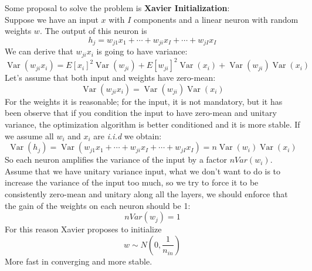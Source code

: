 Some proposal to solve the problem is \textbf{Xavier Initialization}: \\
Suppose we have an input $x$ with $I$ components and a linear neuron with random weights $w$. The output of this neuron is
$$
h_{j}=w_{j 1} x_{1}+\cdots+w_{j i} x_{I}+\cdots+w_{j I} x_{I}
$$
We can derive that $w_{ji}x_{i}$ is going to have variance:
$$
\operatorname{Var}\left(w_{j i} x_{i}\right)=E\left[x_{i}\right]^{2} \operatorname{Var}\left(w_{j i}\right)+E\left[w_{j i}\right]^{2} \operatorname{Var}\left(x_{i}\right)+\operatorname{Var}\left(w_{j i}\right) \operatorname{Var}\left(x_{i}\right)
$$
Let's assume that both input and weights have zero-mean: 
$$
\operatorname{Var}\left(w_{j i} x_{i}\right)=\operatorname{Var}\left(w_{j i}\right) \operatorname{Var}\left(x_{i}\right)
$$
For the weights it is reasonable; for the input, it is not mandatory, but it has been observe that if you condition the input to have zero-mean and unitary variance, the optimization algorithm is better conditioned and it is more stable. 
If we assume all $w_i$ and $x_i$ are \textit{i.i.d} we obtain:
$$
\operatorname{Var}\left(h_{j}\right)=\operatorname{Var}\left(w_{j 1} x_{1}+\cdots+w_{j i} x_{I}+\cdots+w_{j I} x_{I}\right)=n \operatorname{Var}\left(w_{i}\right) \operatorname{Var}\left(x_{i}\right)
$$
So each neuron amplifies the variance of the input by a factor $nVar(w_i)$.\\
Assume that we have unitary variance input, what we don't want to do is to increase the variance of the input too much, so we try to force it to be consistently zero-mean and unitary along all the layers, we should enforce that the gain of the weights on each neuron should be 1: 
$$nVar(w_j) = 1$$
For this reason Xavier proposes to initialize 
$$w \sim N \left( 0,\frac{1}{n_{in}} \right)$$
More fast in converging and more stable.
